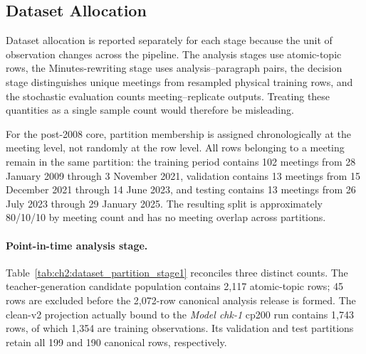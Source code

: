 \subsection*{Dataset Allocation}

Dataset allocation is reported separately for each stage because the unit of
observation changes across the pipeline.  The analysis stages use atomic-topic
rows, the Minutes-rewriting stage uses analysis--paragraph pairs, the decision
stage distinguishes unique meetings from resampled physical training rows, and
the stochastic evaluation counts meeting--replicate outputs.  Treating these
quantities as a single sample count would therefore be misleading.

For the post-2008 core, partition membership is assigned chronologically at the
meeting level, not randomly at the row level.  All rows belonging to a meeting
remain in the same partition: the training period contains 102 meetings from
28 January 2009 through 3 November 2021, validation contains 13 meetings from
15 December 2021 through 14 June 2023, and testing contains 13 meetings from
26 July 2023 through 29 January 2025.  The resulting split is approximately
80/10/10 by meeting count and has no meeting overlap across partitions.


\paragraph*{Point-in-time analysis stage.}
Table~\ref{tab:ch2:dataset_partition_stage1} reconciles three distinct counts.
The teacher-generation candidate population contains 2,117 atomic-topic rows;
45 rows are excluded before the 2,072-row canonical analysis release is
formed.  The clean-v2 projection actually bound to the \textit{Model chk-1}
cp200 run contains 1,743 rows, of which 1,354 are training observations.  Its
validation and test partitions retain all 199 and 190 canonical rows,
respectively.

